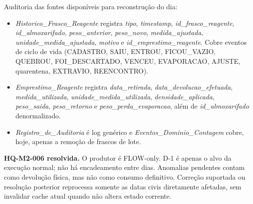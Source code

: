 Auditoria das fontes disponíveis para reconstrução do dia:
\begin{itemize}
    \item \textit{Historico\_Frasco\_Reagente} registra \textit{tipo}, \textit{timestamp}, \textit{id\_frasco\_reagente}, \textit{id\_almoxarifado}, \textit{peso\_anterior}, \textit{peso\_novo}, \textit{medida\_ajustada}, \textit{unidade\_medida\_ajustada}, \textit{motivo} e \textit{id\_emprestimo\_reagente}. Cobre eventos de ciclo de vida (CADASTRO, SAIU, ENTROU, FICOU\_VAZIO, QUEBROU, FOI\_DESCARTADO, VENCEU, EVAPORACAO, AJUSTE, quarentena, EXTRAVIO, REENCONTRO).
    \item \textit{Emprestimo\_Reagente} registra \textit{data\_retirada}, \textit{data\_devolucao\_efetuada}, \textit{medida\_utilizada}, \textit{unidade\_medida\_utilizada}, \textit{densidade\_aplicada}, \textit{peso\_saida}, \textit{peso\_retorno} e \textit{peso\_perda\_evaporacao}, além de \textit{id\_almoxarifado} denormalizado.
    \item \textit{Registro\_de\_Auditoria} é log genérico e \textit{Eventos\_Dominio\_Contagem} cobre, hoje, apenas a remoção de frascos de lote.
\end{itemize}

\textbf{HQ-M2-006 resolvida.} O produtor é FLOW-only. D-1 é apenas o alvo da execução normal; não há encadeamento entre dias. Anomalias pendentes contam como devolução física, mas não como consumo definitivo. Correção suportada ou resolução posterior reprocessa somente as datas civis diretamente afetadas, sem invalidar cache atual quando não altera estado corrente.

